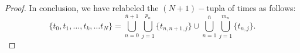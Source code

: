 \documentclass[a4paper, 10pt, final]{article}
\begin{document}
\begin{proof}
  In conclusion, we have relabeled the $(N+1)-$tupla of times as follows: 
  \[\{t_0, t_1, \dots, t_k, \dots t_N\}= 
  \bigcup_{n=0}^{\bar n+1}\bigcup_{j=1}^{p_n}\{t_{n,n+1, j}\}\cup \bigcup_{n=1}^{\overline n} \bigcup_{j=1}^{m_n}\{t_{n, j}\}.
  \]

\end{proof}
\end{document}
